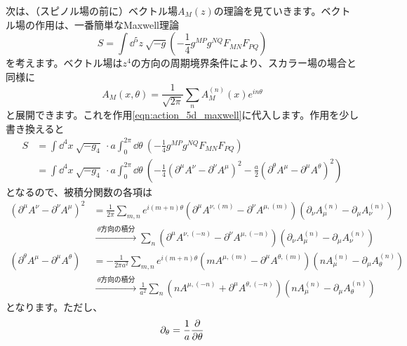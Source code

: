 \documentclass[unicode,a4paper,11pt]{ltjsarticle}
\begin{document}
次は、（スピノル場の前に）ベクトル場$A_{M}(z)$の理論を見ていきます。ベクトル場の作用は、一番簡単なMaxwell理論
\begin{equation}
   S
   =
   \int\dd^5 z\
   \sqrt{-g}
   \left(
   -\frac{1}{4}g^{MP}g^{NQ}F_{MN}F_{PQ}
   \right)
   \label{eqn:action_5d_maxwell}
\end{equation}
を考えます。ベクトル場は$z^{4}$の方向の周期境界条件により、スカラー場の場合と同様に
\begin{equation}
   A_{M}(x,\theta)
   =
   \frac{1}{\sqrt{2\pi}}
   \sum_{n}A_{M}^{(n)}(x)e^{in\theta}
\end{equation}
と展開できます。これを作用\eqref{eqn:action_5d_maxwell}に代入します。作用を少し書き換えると
\begin{align}
   S
    & =
   \int\dd^4 x\ \sqrt{-g_{4}}\
   \cdot
   a\int_{0}^{2\pi}\dd\theta\
   \left( -\frac{1}{4}g^{MP}g^{NQ}F_{MN}F_{PQ} \right)
   \nonumber
   \\
    & =
   \int\dd^4 x\ \sqrt{-g_{4}}\
   \cdot
   a\int_{0}^{2\pi}\dd\theta\
   \left(
   -\frac{1}{4}(\partial^{\mu}A^{\nu}-\partial^{\nu}A^{\mu})^2
   -\frac{a}{2}(\partial^{\theta}A^{\mu}-\partial^{\mu}A^{\theta})^2
   \right)
   \label{eqn:2_2}
\end{align}
となるので、被積分関数の各項は
\begin{align}
   (\partial^{\mu}A^{\nu}-\partial^{\nu}A^{\mu})^2
    & =
   \frac{1}{2\pi}
   \sum_{m,n}e^{i(m+n)\theta}
   \left(
   \partial^{\mu}A^{\nu,(m)}
   -
   \partial^{\nu}A^{\mu,(m)}
   \right)
   \left(
   \partial_{\nu}A_{\mu}^{(n)}
   -
   \partial_{\mu}A_{\nu}^{(n)}
   \right)
   \nonumber
   \\
    & \xrightarrow{\ \text{$\theta$方向の積分}\ }
   \sum_{n}
   \left(
   \partial^{\mu}A^{\nu,(-n)}
   -
   \partial^{\nu}A^{\mu,(-n)}
   \right)
   \left(
   \partial_{\nu}A_{\mu}^{(n)}
   -
   \partial_{\mu}A_{\nu}^{(n)}
   \right)
   \\
   (\partial^{\theta}A^{\mu}-\partial^{\mu}A^{\theta})
    & =
   -
   \frac{1}{2\pi a^2}
   \sum_{m,n}e^{i(m+n)\theta}
   \left(
   mA^{\mu,(m)}-\partial^{\mu}A^{\theta,(m)}
   \right)
   \left(
   nA_{\mu}^{(n)}-\partial_{\mu}A_{\theta}^{(n)}
   \right)
   \nonumber
   \\
    & \xrightarrow{\ \text{$\theta$方向の積分}\ }
   \frac{1}{a^2}
   \sum_{n}
   \left(
   nA^{\mu,(-n)}+\partial^{\mu}A^{\theta,(-n)}
   \right)
   \left(
   nA_{\mu}^{(n)}-\partial_{\mu}A_{\theta}^{(n)}
   \right)
\end{align}
となります。ただし、
\begin{equation}
   \partial_{\theta}
   =
   \frac{1}{a}\pdv{}{\theta}
\end{equation}
\end{document}
